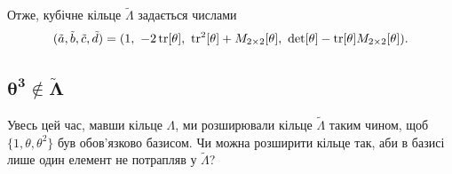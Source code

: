 \documentclass{thesis}
\begin{document}
Отже, кубічне кільце $\tilde{\Lambda}$ задається числами
\begin{equation}
\label{a_b_c_d_for_extended_ring_where_theta_cubed_in_tilde_lambda}
(\tilde{a},\tilde{b},\tilde{c},\tilde{d}) = (1,\ -2 \tr [\theta],\ \tr^2[\theta] + M_{2 \times 2}[\theta],\ \det [\theta] - \tr[\theta] M_{2 \times 2}[\theta]).
\end{equation}

\subsection{$\boldsymbol{\theta^3 \notin \tilde{\Lambda}}$}
Увесь цей час, мавши кільце $\Lambda$, ми розширювали кільце $\tilde{\Lambda}$ таким чином, щоб $\{1,\theta,\theta^2\}$ був обов'язково базисом. Чи можна розширити кільце так, аби в базисі лише один елемент не потрапляв у $\tilde{\Lambda}$?
\end{document}

